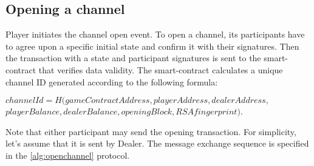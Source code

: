 \subsection {Opening a channel}
Player initiates the channel open event. To open a channel, its participants have to agree upon a specific initial state and confirm it with their signatures. Then the transaction with a state and participant signatures is sent to the smart-contract that verifies data validity. The smart-contract calculates a unique channel ID generated according to the following formula:
\begin{center}
 $channelId = H(gameContractAddress, playerAddress, dealerAddress, $ \\ $playerBalance, dealerBalance, openingBlock, RSAfingerprint)$.
\end{center}
 Note that either participant may send the opening transaction. For simplicity, let’s assume that it is sent by Dealer. The message exchange sequence is specified in the  \autoref {alg:openchannel} protocol.


